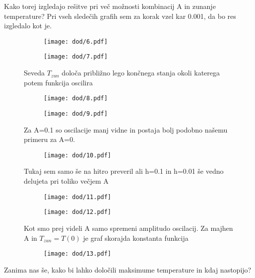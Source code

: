 \documentclass{article}
\begin{document}
Kako torej izgledajo rešitve pri več možnosti kombinacij A in zunanje temperature? Pri vseh sledečih grafih sem za korak vzel kar 0.001, da bo res izgledalo kot je.

\begin{figure}[H]
\begin{subfigure}{.5\textwidth}
\texttt{[image: dod/6.pdf]}
\end{subfigure}
\begin{subfigure}{.5\textwidth}
\texttt{[image: dod/7.pdf]}
\end{subfigure}
\caption*{Seveda $T_{zun}$ določa približno lego končnega stanja okoli katerega potem funkcija oscilira}
\end{figure}

\begin{figure}[H]
\begin{subfigure}{.5\textwidth}
\texttt{[image: dod/8.pdf]}
\end{subfigure}
\begin{subfigure}{.5\textwidth}
\texttt{[image: dod/9.pdf]}
\end{subfigure}
\caption*{Za A=0.1 so oscilacije manj vidne in postaja bolj podobno našemu primeru za A=0.}
\end{figure}

\begin{figure}[H]
\centering
\begin{subfigure}{\textwidth}
\texttt{[image: dod/10.pdf]}
\end{subfigure}
\caption*{Tukaj sem samo še na hitro preveril ali h=0.1 in h=0.01 še vedno delujeta pri toliko večjem A}
\end{figure}

\begin{figure}[H]
\begin{subfigure}{.5\textwidth}
\texttt{[image: dod/11.pdf]}
\end{subfigure}
\begin{subfigure}{.5\textwidth}
\texttt{[image: dod/12.pdf]}
\end{subfigure}
\caption*{Kot smo prej videli A samo spremeni amplitudo oscilacij. Za majhen A in $T_{zun}=T(0)$ je graf skorajda konstanta funkcija}
\end{figure}

\begin{figure}[H]
\centering
\begin{subfigure}{\textwidth}
\texttt{[image: dod/13.pdf]}
\end{subfigure}
\end{figure}
\newpage
Zanima nas še, kako bi lahko določili maksimume temperature in kdaj nastopijo?
\end{document}
